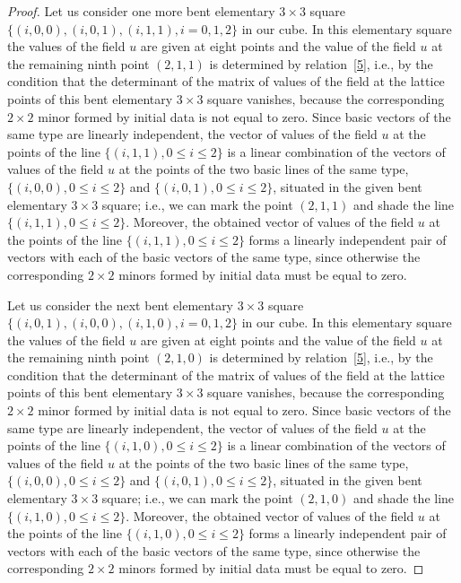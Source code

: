 \begin{proof}
Let us consider one more bent elementary $3 \times 3$ square $\{(i,
0, 0), (i, 0, 1), (i, 1, 1), i = 0, 1, 2\}$ in our cube. In this
elementary square the values of the f\/ield $u$ are given at eight
points and the value of the f\/ield $u$ at the remaining ninth point
$(2, 1, 1)$ is determined by relation~\eqref{5}, i.e., by the
condition that the determinant of the matrix of values of the f\/ield
at the lattice points of this bent elementary $3 \times 3$ square
vanishes, because the corresponding $2 \times 2$ minor formed by
initial data is not equal to zero. Since basic vectors of the same
type are linearly independent, the vector of values of the f\/ield $u$
at the points of the line $\{(i, 1, 1), 0 \leq i \leq 2\}$ is a
linear combination of the vectors of values of the f\/ield $u$ at the
points of the two basic lines of the same type, $\{(i, 0, 0), 0 \leq
i \leq 2\}$ and $\{(i, 0, 1), 0 \leq i \leq 2\}$, situated in the
given bent elementary $3 \times 3$ square; i.e., we can mark the
point $(2, 1, 1)$ and shade the line $\{(i, 1, 1), 0 \leq i \leq
2\}$. Moreover, the obtained vector of values of the f\/ield $u$ at
the points of the line $\{(i, 1, 1), 0 \leq i \leq 2\}$ forms a
linearly independent pair of vectors with each of the basic vectors
of the same type, since otherwise the corresponding $2 \times 2$
minors formed by initial data must be equal to zero.



Let us consider the next bent elementary $3 \times 3$ square $\{(i,
0, 1), (i, 0, 0), (i, 1, 0),  i = 0, 1, 2\}$ in our cube. In this
elementary square the values of the f\/ield $u$ are given at eight
points and the value of the f\/ield $u$ at the remaining ninth point
$(2, 1, 0)$ is determined by relation~\eqref{5}, i.e., by the
condition that the determinant of the matrix of values of the f\/ield
at the lattice points of this bent elementary $3 \times 3$ square
vanishes, because the corresponding $2 \times 2$ minor formed by
initial data is not equal to zero. Since basic vectors of the same
type are linearly independent, the vector of values of the f\/ield $u$
at the points of the line $\{(i, 1, 0), 0 \leq i \leq 2\}$ is a
linear combination of the vectors of values of the f\/ield $u$ at the
points of the two basic lines of the same type, $\{(i, 0, 0), 0 \leq
i \leq 2\}$ and $\{(i, 0, 1), 0 \leq i \leq 2\}$, situated in the
given bent elementary $3 \times 3$ square; i.e., we can mark the
point $(2, 1, 0)$ and shade the line $\{(i, 1, 0), 0 \leq i \leq
2\}$. Moreover, the obtained vector of values of the f\/ield $u$ at
the points of the line $\{(i, 1, 0), 0 \leq i \leq 2\}$ forms a
linearly independent pair of vectors with each of the basic vectors
of the same type, since otherwise the corresponding $2 \times 2$
minors formed by initial data must be equal to zero.





\end{proof}
